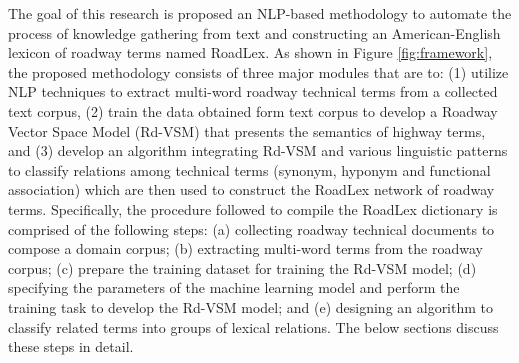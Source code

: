\documentclass[Journal,InsideFigs, DoubleSpace]{ascelike} %
\begin{document}
The goal of this research is proposed an NLP-based methodology to automate the process of knowledge gathering from text and constructing an American-English lexicon of roadway terms named RoadLex. As shown in Figure \ref{fig:framework}, the proposed methodology consists of three major modules that are to: (1) utilize NLP techniques to extract multi-word roadway technical terms from a collected text corpus, (2) train the data obtained form text corpus to develop a Roadway Vector Space Model (Rd-VSM) that presents the semantics of highway terms, and (3) develop an algorithm integrating Rd-VSM and various linguistic patterns to classify relations among technical terms (synonym, hyponym and functional association) which are then used to construct the RoadLex network of roadway terms. Specifically, the procedure followed to compile the RoadLex dictionary is comprised of the following steps: (a) collecting roadway technical documents to compose a domain corpus; (b) extracting multi-word terms from the roadway corpus; (c) prepare the training dataset for training the Rd-VSM model; (d) specifying the parameters of the machine learning model and perform the training task to develop the Rd-VSM model; and (e) designing an algorithm to classify related terms into groups of lexical relations. The below sections discuss these steps in detail.

%
%
\end{document}
